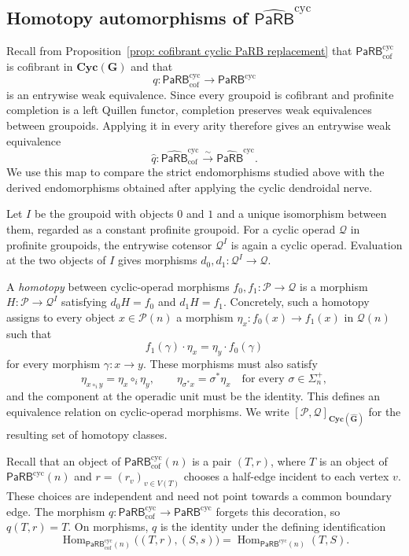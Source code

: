 \documentclass{amsart}
\newcommand{\calQ}{\mathcal{Q}}
\newcommand{\Grpd}{\mathbf{G}}
\newcommand{\PaRB}{\mathsf{PaRB}}
\newcommand{\calP}{\mathcal{P}}
\newcommand{\Cyc}{\mathbf{Cyc}}
\newcommand{\Hom}{\operatorname{Hom}}
\theoremstyle{definition}
\numberwithin{equation}{section}
\begin{document}
\subsection{Homotopy automorphisms of
\texorpdfstring{$\widehat{\PaRB}^{\mathrm{cyc}}$}{PaRBcyc}}
\label{subsec: homotopy automorphisms of PaRB}

Recall from
Proposition~\ref{prop: cofibrant cyclic PaRB replacement} that
$\PaRB_{\mathrm{cof}}^{\mathrm{cyc}}$ is cofibrant in
$\Cyc(\Grpd)$ and that
\[
q\colon
\PaRB_{\mathrm{cof}}^{\mathrm{cyc}}
\longrightarrow
\PaRB^{\mathrm{cyc}}
\]
is an entrywise weak equivalence. Since every groupoid is cofibrant
and profinite completion is a left Quillen functor, completion
preserves weak equivalences between groupoids. Applying it in every
arity therefore gives an entrywise weak equivalence
\begin{equation}
\label{eq: completed cyclic PaRB resolution}
\widehat q\colon
\widehat{\PaRB}_{\mathrm{cof}}^{\mathrm{cyc}}
\overset{\sim}{\longrightarrow}
\widehat{\PaRB}^{\mathrm{cyc}}.
\end{equation}
We use this map to compare the strict endomorphisms studied above
with the derived endomorphisms obtained after applying the cyclic
dendroidal nerve.

Let $I$ be the groupoid with objects $0$ and $1$ and a unique
isomorphism between them, regarded as a constant profinite
groupoid. For a cyclic operad $\calQ$ in profinite groupoids, the
entrywise cotensor $\calQ^I$ is again a cyclic operad. Evaluation at
the two objects of $I$ gives morphisms
$d_0,d_1\colon\calQ^I\to\calQ$.

A \emph{homotopy} between cyclic-operad morphisms
$f_0,f_1\colon\calP\to\calQ$ is a morphism
$H\colon\calP\to\calQ^I$ satisfying $d_0H=f_0$ and $d_1H=f_1$.
Concretely, such a homotopy assigns to every object
$x\in\calP(n)$ a morphism
$\eta_x\colon f_0(x)\to f_1(x)$ in $\calQ(n)$ such that
\[
f_1(\gamma)\cdot\eta_x
=
\eta_y\cdot f_0(\gamma)
\]
for every morphism $\gamma\colon x\to y$. These morphisms must also
satisfy
\[
\eta_{x\circ_i y}
=
\eta_x\circ_i\eta_y,
\qquad
\eta_{\sigma^*x}
=
\sigma^*\eta_x
\quad\text{for every }\sigma\in\Sigma_n^+,
\]
and the component at the operadic unit must be the identity. This defines an equivalence relation on cyclic-operad morphisms. We
write $[\calP,\calQ]_{\Cyc(\widehat{\Grpd})}$ for the resulting set of homotopy classes.

Recall that an object of
$\PaRB_{\mathrm{cof}}^{\mathrm{cyc}}(n)$ is a pair $(T,r)$, where
$T$ is an object of $\PaRB^{\mathrm{cyc}}(n)$ and
$r=(r_v)_{v\in V(T)}$ chooses a half-edge incident to each
vertex $v$. These choices are independent and need not point
towards a common boundary edge. The morphism
$q\colon\PaRB_{\mathrm{cof}}^{\mathrm{cyc}}
\to\PaRB^{\mathrm{cyc}}$
forgets this decoration, so $q(T,r)=T$. On morphisms, $q$ is
the identity under the defining identification
\[
\Hom_{\PaRB_{\mathrm{cof}}^{\mathrm{cyc}}(n)}
\bigl((T,r),(S,s)\bigr)
=
\Hom_{\PaRB^{\mathrm{cyc}}(n)}(T,S).
\]
\end{document}
